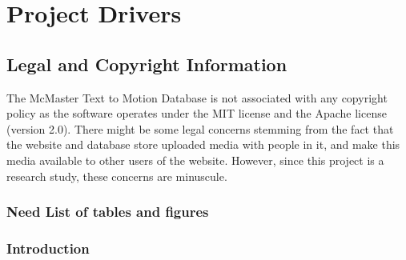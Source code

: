 \documentclass{scrreprt}
\begin{document}
\newcommand{\requirement}[9]{%
\fbox{\parbox{\textwidth}{%
\parbox[t]{.333\textwidth}{\raggedright%
\textbf{Req. \#}: \refstepcounter{RequirementNumber} \arabic{RequirementNumber} \label{#1}}%
\parbox[t]{.333\textwidth}{\centering%
\textbf{Req. Type}: #2}%
\parbox[t]{.333\textwidth}{\raggedleft%
\textbf{Use Case \#}: \ref{#3}}
\newline\\
\textbf{Description}: #4\\\\
\textbf{Rationale}: #5\\\\
\textbf{Originator}: #6\\\\
\textbf{Fit Criterion}: #7\\\\
\textbf{Priority}: #8 \hfill \textbf{History}: #9\\\\
}}}

\chapter{Project Drivers}

\section{Legal and Copyright Information}

The McMaster Text to Motion Database is not associated with any copyright policy as the software operates under the MIT license and the Apache license (version 2.0). There might be some legal concerns stemming from the fact that the website and database store uploaded media with people in it, and make this media available to other users of the website. However, since this project is a research study, these concerns are minuscule.

\subsection{Need List of tables and figures}

\subsection{Introduction}
\end{document}
